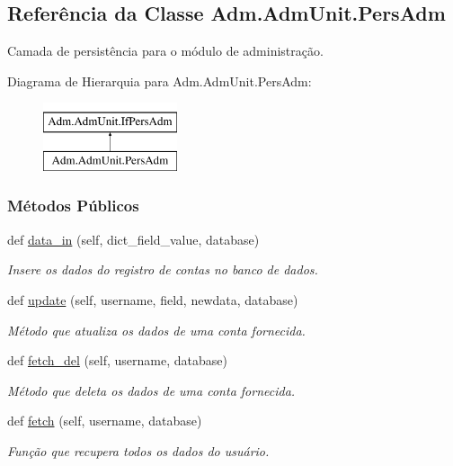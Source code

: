 \hypertarget{classAdm_1_1AdmUnit_1_1PersAdm}{}\subsection{Referência da Classe Adm.\+Adm\+Unit.\+Pers\+Adm}
\label{classAdm_1_1AdmUnit_1_1PersAdm}


Camada de persistência para o módulo de administração.  


Diagrama de Hierarquia para Adm.\+Adm\+Unit.\+Pers\+Adm\+:\begin{figure}[H]
\begin{center}
\leavevmode
\includegraphics[height=2.000000cm]{dc/d1a/classAdm_1_1AdmUnit_1_1PersAdm}
\end{center}
\end{figure}
\subsubsection*{Métodos Públicos}
\begin{DoxyCompactItemize}
\item 
def \hyperlink{classAdm_1_1AdmUnit_1_1PersAdm_ab9b66eb770103a270de417a6b936ad21}{data\+\_\+in} (self, dict\+\_\+field\+\_\+value, database)
\begin{DoxyCompactList}\small\item\em Insere os dados do registro de contas no banco de dados. \end{DoxyCompactList}\item 
def \hyperlink{classAdm_1_1AdmUnit_1_1PersAdm_a65d586fd8aaf0a9f2f7c609405721dff}{update} (self, username, field, newdata, database)
\begin{DoxyCompactList}\small\item\em Método que atualiza os dados de uma conta fornecida. \end{DoxyCompactList}\item 
def \hyperlink{classAdm_1_1AdmUnit_1_1PersAdm_a2b5453709dfc3b1c6e5f9f85dc61d228}{fetch\+\_\+del} (self, username, database)
\begin{DoxyCompactList}\small\item\em Método que deleta os dados de uma conta fornecida. \end{DoxyCompactList}\item 
def \hyperlink{classAdm_1_1AdmUnit_1_1PersAdm_a0813f79d2ef26ab014c21f4ae2217045}{fetch} (self, username, database)
\begin{DoxyCompactList}\small\item\em Função que recupera todos os dados do usuário. \end{DoxyCompactList}\end{DoxyCompactItemize}


